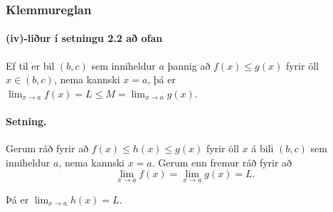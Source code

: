 \documentclass[icelandic,a4paper,12pt]{article}
\begin{document}
\subsubsection*{Klemmureglan}

\pause

\paragraph{(iv)-liður í setningu 2.2 að ofan}
Ef til er bil $(b,c)$ sem inniheldur $a$ þannig að 
$f(x)\leq g(x)$ fyrir öll $x\in (b,c)$, nema kannski $x=a$, þá er
 $\lim_{x\rightarrow a}f(x)=L\leq M=\lim_{x\rightarrow a}g(x)$.


\pause

\paragraph{Setning.}  Gerum ráð fyrir að $f(x)\leq
h(x)\leq g(x)$ fyrir öll $x$ á bili $(b, c)$ sem
inniheldur $a$, nema kannski $x=a$.  Gerum enn fremur ráð fyrir að 
$$\lim_{x\rightarrow a}f(x)=\lim_{x\rightarrow a}g(x)=L.$$

\pause

Þá er $\lim_{x\rightarrow a}h(x)=L$.
 



 
 
% 
 
\end{document}
